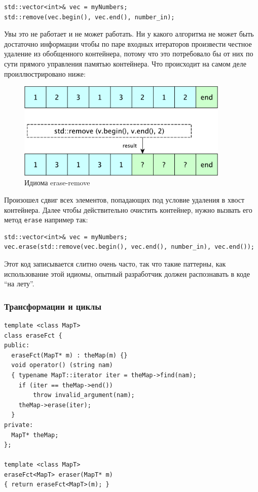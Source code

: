 \documentclass[a4paper,12pt,oneside]{article}
\begin{document}
\begin{lstlisting}
std::vector<int>& vec = myNumbers;
std::remove(vec.begin(), vec.end(), number_in);
\end{lstlisting}

Увы это не работает и не может работать. Ни у какого алгоритма не может быть достаточно информации чтобы по паре входных итераторов произвести честное удаление из обобщенного контейнера, потому что это потребовало бы от них по сути прямого управления памятью контейнера. Что происходит на самом деле проиллюстрировано ниже:

\begin{figure}[h!]
\centering
\includegraphics[width=0.9\textwidth]{illustrations/erase-remove-crop.pdf}
\caption{Идиома erase-remove}
\label{fig:erase_remove}
\end{figure}

Произошел сдвиг всех элементов, попадающих под условие удаления в хвост контейнера. Далее чтобы действительно очистить контейнер, нужно вызвать его метод \lstinline!erase! например так:

\begin{lstlisting}
std::vector<int>& vec = myNumbers;
vec.erase(std::remove(vec.begin(), vec.end(), number_in), vec.end());
\end{lstlisting}

Этот код записывается слитно очень часто, так что такие паттерны, как использование этой идиомы, опытный разработчик должен распознавать в коде ``на лету''.

\subsubsection{Трансформации и циклы}

\begin{lstlisting}
template <class MapT>
class eraseFct {
public:
  eraseFct(MapT* m) : theMap(m) {}
  void operator() (string nam)
  { typename MapT::iterator iter = theMap->find(nam);
    if (iter == theMap->end()) 
        throw invalid_argument(nam);
    theMap->erase(iter);
  }
private:
  MapT* theMap;
};

template <class MapT>
eraseFct<MapT> eraser(MapT* m) 
{ return eraseFct<MapT>(m); }
\end{lstlisting}
\end{document}
